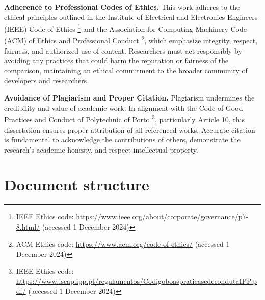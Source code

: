 \textbf{Adherence to Professional Codes of Ethics.} This work adheres to the ethical principles outlined in the Institute of Electrical and Electronics Engineers (IEEE) Code of Ethics \footnote{IEEE Ethics code: \url{https://www.ieee.org/about/corporate/governance/p7-8.html/} (accessed 1 December 2024)} and the Association for Computing Machinery Code (ACM) of Ethics and Professional Conduct \footnote{ACM Ethics code: \url{https://www.acm.org/code-of-ethics/} (accessed 1 December 2024)}, which emphasize integrity, respect, fairness, and authorized use of content. Researchers must act responsibly by avoiding any practices that could harm the reputation or fairness of the comparison, maintaining an ethical commitment to the broader community of developers and researchers.

\textbf{Avoidance of Plagiarism and Proper Citation.} Plagiarism undermines the credibility and value of academic work. In alignment with the Code of Good Practices and Conduct of Polytechnic of Porto \footnote{IEEE Ethics code: \url{https://www.iscap.ipp.pt/regulamentos/CodigoboaspraticasedecondutaIPP.pdf/} (accessed 1 December 2024)}, particularly Article 10, this dissertation ensures proper attribution of all referenced works. Accurate citation is fundamental to acknowledge the contributions of others, demonstrate the research’s academic honesty, and respect intellectual property.

\section{Document structure} 